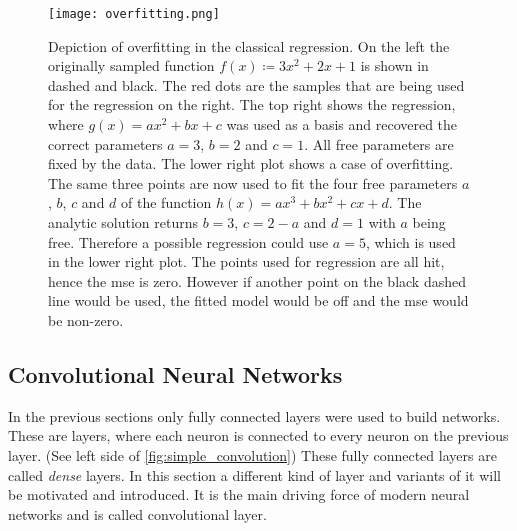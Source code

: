 \begin{figure}
\centering
\texttt{[image: overfitting.png]}
\caption[Overfitting]{Depiction of overfitting in the classical regression. On the left the originally sampled function $f(x)\coloneqq 3x^2 + 2x + 1$ is shown in dashed and black. The red dots are the samples that are being used for the regression on the right. The top right shows the regression, where $g(x)=a x^2 + b x + c$ was used as a basis and recovered the correct parameters $a=3$, $b=2$ and $c=1$. All free parameters are fixed by the data. The lower right plot shows a case of overfitting. The same three points are now used to fit the four free parameters $a$, $b$, $c$ and $d$ of the function $h(x)=a x^3 + b x^2 + c x + d$. The analytic solution returns $b=3$, $c=2-a$ and $d=1$ with $a$ being free. Therefore a possible regression could use $a=5$, which is used in the lower right plot. The points used for regression are all hit, hence the \gls{mse} is zero. However if another point on the black dashed line would be used, the fitted model would be off and the \gls{mse} would be non-zero.}\label{fig:overfitting}
\end{figure}

\subsection{Convolutional Neural Networks}\label{sec:cnn}
In the previous sections only fully connected layers were used to build networks. These are layers, where each neuron is connected to every neuron on the previous layer. (See left side of \autoref{fig:simple_convolution}) These fully connected layers are called \emph{dense} layers. In this section a different kind of layer and variants of it will be motivated and introduced. It is the main driving force of modern neural networks and is called convolutional layer.

